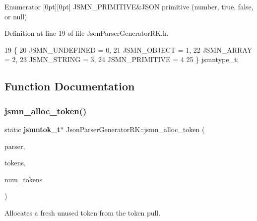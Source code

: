 \begin{DoxyEnumFields}{Enumerator}
[0pt][0pt]{}\mbox{\label{namespace_json_parser_generator_r_k_a45d8af9d310679633d258ed9b2caeeb3af36fefddaeac9a91bc69c938c8924568}} 
J\+S\+M\+N\+\_\+\+P\+R\+I\+M\+I\+T\+I\+VE&J\+S\+ON primitive (number, true, false, or null) \\
\hline

\end{DoxyEnumFields}


Definition at line 19 of file Json\+Parser\+Generator\+R\+K.\+h.


\begin{DoxyCode}
19                  \{
20         JSMN_UNDEFINED = 0, 
21         JSMN_OBJECT = 1,    
22         JSMN_ARRAY = 2,     
23         JSMN_STRING = 3,    
24         JSMN_PRIMITIVE = 4  
25     \} jsmntype_t;
\end{DoxyCode}


\subsection{Function Documentation}
\mbox{\label{namespace_json_parser_generator_r_k_a5b9c58cf485e408ef0b95c201674a1bc}} 
\subsubsection{jsmn\+\_\+alloc\+\_\+token()}
{\footnotesize\ttfamily static \textbf{ jsmntok\+\_\+t}$\ast$ Json\+Parser\+Generator\+R\+K\+::jsmn\+\_\+alloc\+\_\+token (\begin{DoxyParamCaption}\item[{\textbf{ jsmn\+\_\+parser} $\ast$}]{parser,  }\item[{\textbf{ jsmntok\+\_\+t} $\ast$}]{tokens,  }\item[{size\+\_\+t}]{num\+\_\+tokens }\end{DoxyParamCaption})\hspace{0.3cm}{\ttfamily [static]}}

Allocates a fresh unused token from the token pull. 

